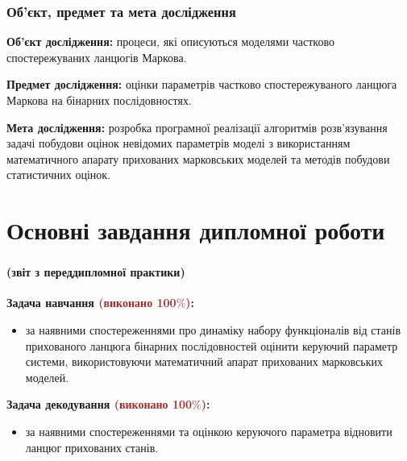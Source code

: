 \documentclass[12pt,mathserif]{beamer}
\theoremstyle{plain}
\begin{document}
\begin{frame}
    \frametitle{Об'єкт, предмет та мета дослідження}
    \textbf{Об'єкт дослідження:} процеси, які описуються моделями частково спостережуваних ланцюгів Маркова.
    \vspace{0.5cm}

    \textbf{Предмет дослідження:} оцінки параметрів частково спостережуваного ланцюга Маркова на бінарних послідовностях.

    \vspace{0.5cm}
    \textbf{Мета дослідження:} розробка програмної реалізації алгоритмів розв'язування задачі побудови оцінок невідомих параметрів моделі з використанням математичного апарату прихованих марковських моделей та методів побудови статистичних оцінок.
\end{frame}

\section{Основні завдання дипломної роботи}

\begin{frame}
    \frametitle{\insertsection}
    \framesubtitle{(звіт з переддипломної практики)}
    \textbf{Задача навчання \textcolor{brown}{(виконано 100$\%$)}:}
    \begin{itemize}
        \item за наявними спостереженнями про динаміку набору функціоналів від станів прихованого ланцюга бінарних послідовностей оцінити керуючий параметр системи, використовуючи математичний апарат прихованих марковських моделей.
    \end{itemize}

    \vspace{0.5cm}
    \textbf{Задача декодування \textcolor{brown}{(виконано 100$\%$)}:}
    \begin{itemize}
        \item за наявними спостереженнями та оцінкою керуючого параметра відновити ланцюг прихованих станів.
    \end{itemize}
\end{frame}
\end{document}
